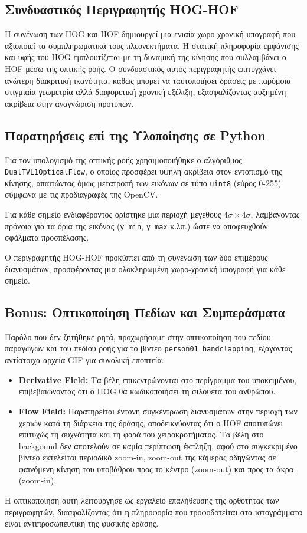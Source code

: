 \documentclass[12pt]{article}
\begin{document}
\subsection*{Συνδυαστικός Περιγραφητής HOG-HOF}
\hspace{0.6cm}Η συνένωση των HOG και HOF δημιουργεί μια ενιαία χωρο-χρονική υπογραφή που αξιοποιεί τα συμπληρωματικά τους πλεονεκτήματα. 
Η στατική πληροφορία εμφάνισης και υφής του HOG εμπλουτίζεται με τη δυναμική της κίνησης που συλλαμβάνει ο HOF μέσω της οπτικής ροής. 
Ο συνδυαστικός αυτός περιγραφητής επιτυγχάνει ανώτερη διακριτική ικανότητα, καθώς μπορεί να ταυτοποιήσει δράσεις με παρόμοια 
στιγμιαία γεωμετρία αλλά διαφορετική χρονική εξέλιξη, εξασφαλίζοντας αυξημένη ακρίβεια στην αναγνώριση προτύπων.

\subsection*{Παρατηρήσεις επί της Υλοποίησης σε Python}
\hspace{0.6cm}Για τον υπολογισμό της οπτικής ροής χρησιμοποιήθηκε ο αλγόριθμος \texttt{DualTVL1OpticalFlow}, ο οποίος προσφέρει υψηλή ακρίβεια στον εντοπισμό της κίνησης, απαιτώντας όμως μετατροπή των εικόνων σε τύπο \texttt{uint8} (εύρος 0-255) σύμφωνα με τις προδιαγραφές της OpenCV.

Για κάθε σημείο ενδιαφέροντος ορίστηκε μια περιοχή μεγέθους $4\sigma \times 4\sigma$, λαμβάνοντας πρόνοια για τα όρια της εικόνας (\texttt{y\_min}, \texttt{y\_max} κ.λπ.) ώστε να αποφευχθούν σφάλματα προσπέλασης.

Ο περιγραφητής HOG-HOF προκύπτει από τη συνένωση των δύο επιμέρους διανυσμάτων, προσφέροντας μια ολοκληρωμένη χωρο-χρονική υπογραφή για κάθε σημείο.


\subsection*{Bonus: Οπτικοποίηση Πεδίων και Συμπεράσματα}
Παρόλο που δεν ζητήθηκε ρητά, προχωρήσαμε στην οπτικοποίηση του πεδίου παραγώγων και του πεδίου ροής για το βίντεο \texttt{person01\_handclapping}, εξάγοντας αντίστοιχα αρχεία GIF για συνολική εποπτεία.
\begin{itemize}
    \item \textbf{Derivative Field:} Τα βέλη επικεντρώνονται στο περίγραμμα του υποκειμένου, επιβεβαιώνοντας ότι ο HOG θα κωδικοποιήσει τη σιλουέτα του ανθρώπου.
    \item \textbf{Flow Field:} Παρατηρείται έντονη συγκέντρωση διανυσμάτων στην περιοχή των χεριών κατά τη διάρκεια της δράσης, αποδεικνύοντας ότι ο HOF αποτυπώνει επιτυχώς τη συχνότητα και τη φορά του χειροκροτήματος. Τα βέλη στο backgound δεν αποτελούν σε καμία περίπτωση έκπληξη, αφού στο συγκεκριμένο βίντεο εκτελείται περιοδικό zoom-in, zoom-out της κάμερας οδηγώντας σε φαινόμενη κίνηση του υποβάθρου προς το κέντρο (zoom-out) και προς τα άκρα (zoom-in).
\end{itemize}
Η οπτικοποίηση αυτή λειτούργησε ως εργαλείο επαλήθευσης της ορθότητας των περιγραφητών, διασφαλίζοντας ότι η πληροφορία που τροφοδοτείται στα ιστογράμματα είναι αντιπροσωπευτική της φυσικής δράσης.
\end{document}

